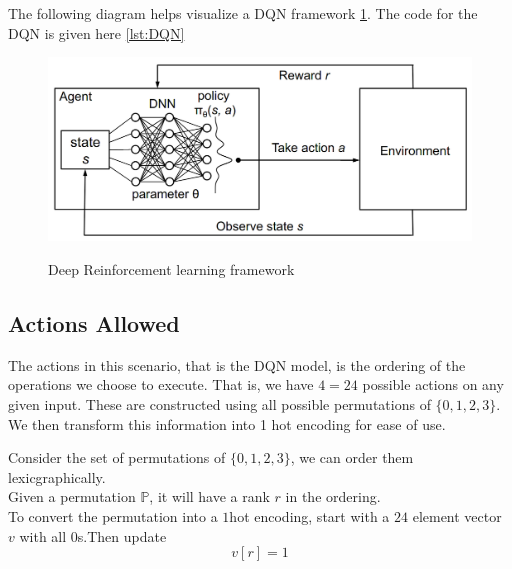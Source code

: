 The following diagram helps visualize a DQN framework \ref{fig:dqn}. The code for the DQN is given here \ref{lst:DQN}\\
\begin{figure}
\caption{Deep Reinforcement learning framework}
\label{fig:dqn}
\centering
\includegraphics[scale=0.3]{DQN.png}\\
\end{figure}

\subsection{Actions Allowed}
The actions in this scenario, that is the DQN model, is the ordering of the operations we choose to execute. That is, we have $4 = 24$ possible actions on any given input. These are constructed using all possible permutations of $\{0,1,2,3\}$. We then transform this information into 1 hot encoding for ease of use.
\par Consider the set of permutations of $\{0,1,2,3\}$, we can order them lexicgraphically.\\
Given a permutation $\mathbb{P}$, it will have a rank $r$ in the ordering.\\
To convert the permutation into a $1$hot encoding, start with a $24$ element vector $v$ with all $0$s.Then update 
$$v[r]=1$$

